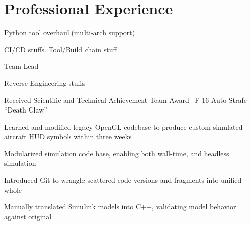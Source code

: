 \documentclass[letterpaper]{deedy-resume}
\begin{document}
\begin{minipage}[t]{0.66\textwidth} %

	\section{Professional Experience}
	\begin{compactitem}
        \item Python tool overhaul (multi-arch support)
        \item CI/CD stuffs. Tool/Build chain stuff
        \item Team Lead
        \item Reverse Engineering stuffs
	\end{compactitem}
    \vspace{3em}

	\begin{compactitem}
		\item Received Scientific and Technical Achievement Team Award \textemdash\ F-16 Auto-Strafe ``Death
            Claw''
        \item Learned and modified legacy OpenGL codebase to produce custom simulated aircraft HUD symbols
            within three weeks
		\item Modularized simulation code base, enabling both wall-time, and headless simulation
        \item Introduced Git to wrangle scattered code versions and fragments into unified whole
        \item Manually translated Simulink models into C++, validating model behavior against original
	\end{compactitem}
    \vspace{3em}


\end{minipage}
\end{document}
